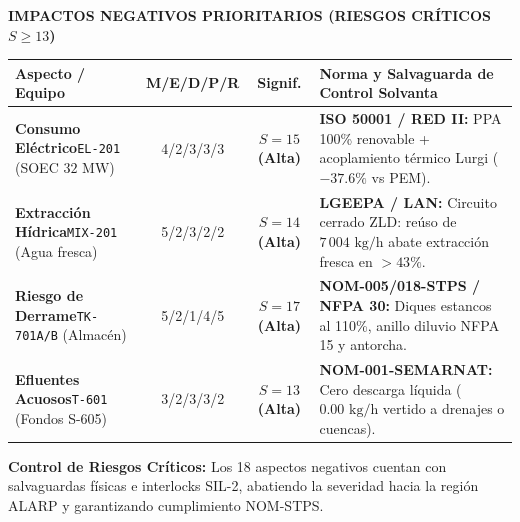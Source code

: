 \documentclass[10pt,landscape]{article}
\newcommand{\badgered}[1]{\colorbox{badgered}{\textbf{\color{darkred}\fontsize{6.8pt}{8pt}\selectfont #1}}}
\begin{document}
\noindent
\begin{minipage}[t]{0.492\textwidth}
  \begin{tcolorbox}[
    colback=white,
    colframe=darkred!80!black,
    arc=1.5mm,
    boxrule=0.75pt,
    top=2.0pt,
    bottom=2.0pt,
    left=3pt,
    right=3pt,
    height=6.15cm
  ]
    \begin{tcolorbox}[colback=darkred!90!black,colframe=darkred!90!black,arc=1.0mm,boxrule=0pt,top=1.5pt,bottom=1.5pt,left=2pt,right=2pt]
      \centering
      {\color{white}\fontsize{6.8pt}{8.0pt}\selectfont \textbf{IMPACTOS NEGATIVOS PRIORITARIOS (RIESGOS CRÍTICOS $S \ge 13$)}}
    \end{tcolorbox}
    \vspace{1.5pt}
    \fontsize{4.6pt}{5.6pt}\selectfont
    \renewcommand{\arraystretch}{1.12}
    \begin{tabularx}{\linewidth}{p{2.35cm} c c X}
      \toprule
      \rowcolor{tableheader}
      \textbf{\color{white}Aspecto / Equipo} & \textbf{\color{white}M/E/D/P/R} & \textbf{\color{white}Signif.} & \textbf{\color{white}Norma y Salvaguarda de Control Solvanta} \\
      \midrule
      \rowcolor{roweven}
      \textbf{Consumo Eléctrico}\newline\texttt{EL-201} (SOEC $32\text{ MW}$) & 4/2/3/3/3 & \badgered{$S=15$ (Alta)} & \textbf{ISO 50001 / RED II:} PPA 100\% renovable + acoplamiento térmico Lurgi ($-37.6\%$ vs PEM). \\
      \rowcolor{rowodd}
      \textbf{Extracción Hídrica}\newline\texttt{MIX-201} (Agua fresca) & 5/2/3/2/2 & \badgered{$S=14$ (Alta)} & \textbf{LGEEPA / LAN:} Circuito cerrado ZLD: reúso de $7\,004\text{ kg/h}$ abate extracción fresca en $>43\%$. \\
      \rowcolor{roweven}
      \textbf{Riesgo de Derrame}\newline\texttt{TK-701A/B} (Almacén) & 5/2/1/4/5 & \badgered{$S=17$ (Alta)} & \textbf{NOM-005/018-STPS / NFPA 30:} Diques estancos al 110\%, anillo diluvio NFPA 15 y antorcha. \\
      \rowcolor{rowodd}
      \textbf{Efluentes Acuosos}\newline\texttt{T-601} (Fondos S-605) & 3/2/3/3/2 & \badgered{$S=13$ (Alta)} & \textbf{NOM-001-SEMARNAT:} Cero descarga líquida ($0.00\text{ kg/h}$ vertido a drenajes o cuencas). \\
      \bottomrule
    \end{tabularx}
    \vspace{2pt}
    \begin{tcolorbox}[colback=darkred!6,colframe=darkred!25,arc=1.0mm,boxrule=0.5pt,top=1.5pt,bottom=1.5pt,left=3pt,right=3pt]
      \fontsize{4.6pt}{5.6pt}\selectfont
      \textbf{\color{darkred!90!black}Control de Riesgos Críticos:} Los 18 aspectos negativos cuentan con salvaguardas físicas e interlocks SIL-2, abatiendo la severidad hacia la región ALARP y garantizando cumplimiento NOM-STPS.
    \end{tcolorbox}
  \end{tcolorbox}
\end{minipage}
\end{document}

